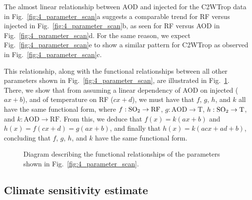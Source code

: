 \documentclass[draft]{agujournal2019}
\begin{document}
The almost linear relationship between AOD and injected  for the C2WTrop data in
Fig.~\ref{fig:4_parameter_scan}a suggests a comparable trend for RF versus injected
 in Fig.~\ref{fig:4_parameter_scan}b, as seen for RF versus AOD in
Fig.~\ref{fig:4_parameter_scan}d. For the same reason, we expect
Fig.~\ref{fig:4_parameter_scan}e to show a similar pattern for C2WTrop as observed in
Fig.~\ref{fig:4_parameter_scan}c.

This relationship, along with the functional relationships between all other parameters
shown in Fig.~\ref{fig:4_parameter_scan}, are illustrated in
Fig.~\ref{fig:5_diagram_of_function_relations}. There, we show that from assuming a
linear dependency of AOD on injected  (\(ax+b\)), and of temperature on RF
(\(cx+d\)), we must have that \(f\), \(g\), \(h\), and \(k\) all have the same
functional form, where \(f: \ce{SO2} \to \mathrm{RF}\), \(g: \mathrm{AOD} \to
\mathrm{T}\), \(h: \ce{SO2} \to \mathrm{T}\), and \(k: \mathrm{AOD} \to \mathrm{RF}\).
From this, we deduce that \(f(x)=k(ax+b)\) and \(h(x)=f(cx+d)=g(ax+b)\), and finally
that \(h(x)=k(acx+ad+b)\), concluding that \(f\), \(g\), \(h\), and \(k\) have the same
functional form.

\begin{figure}
  \centering


  \caption{Diagram describing the functional relationships of the parameters shown in
    Fig.~\ref{fig:4_parameter_scan}.}\label{fig:5_diagram_of_function_relations}%
\end{figure}

\subsection{Climate sensitivity estimate}
\end{document}
